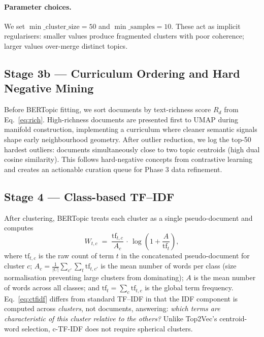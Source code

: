 \documentclass[10pt,twocolumn,a4paper]{article}
\begin{document}
\paragraph{Parameter choices.} We set $\min\_\text{cluster\_size}{=}50$ and $\min\_\text{samples}{=}10$. These act as implicit regularisers: smaller values produce fragmented clusters with poor coherence; larger values over-merge distinct topics.

\subsection{Stage 3b --- Curriculum Ordering and Hard Negative Mining}
\label{sec:curriculum_hnm}

Before BERTopic fitting, we sort documents by text-richness score $R_d$ from Eq.~\eqref{eq:rich}. High-richness documents are presented first to UMAP during manifold construction, implementing a curriculum where cleaner semantic signals shape early neighbourhood geometry. After outlier reduction, we log the top-50 hardest outliers: documents simultaneously close to two topic centroids (high dual cosine similarity). This follows hard-negative concepts from contrastive learning~\cite{chen2020} and creates an actionable curation queue for Phase 3 data refinement.

\subsection{Stage 4 --- Class-based TF--IDF}
\label{sec:ctfidf}

After clustering, BERTopic treats each cluster as a single pseudo-document and computes
\begin{equation}
\label{eq:ctfidf}
W_{t,c} \;=\; \frac{\text{tf}_{t,c}}{A_c}\,\cdot\,\log\!\left(1 + \frac{A}{\text{tf}_t}\right),
\end{equation}
where $\text{tf}_{t,c}$ is the raw count of term $t$ in the concatenated pseudo-document for cluster $c$; $A_c = \frac{1}{|C|}\sum_{c'}\sum_t \text{tf}_{t,c'}$ is the mean number of words per class (size normalisation preventing large clusters from dominating); $A$ is the mean number of words across all classes; and $\text{tf}_t = \sum_c \text{tf}_{t,c}$ is the global term frequency. Eq.~\eqref{eq:ctfidf} differs from standard TF--IDF in that the IDF component is computed across \emph{clusters}, not documents, answering: \emph{which terms are characteristic of this cluster relative to the others?} Unlike Top2Vec's centroid-word selection, c-TF-IDF does not require spherical clusters.
\end{document}
